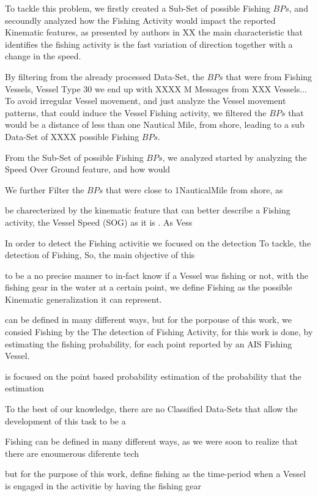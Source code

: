 To tackle this problem, we firstly created a Sub-Set of possible Fishing $BPs$, and secoundly analyzed how the Fishing Activity would impact the reported Kinematic features, as presented by authors in XX the main characteristic that identifies the fishing activity is the fast variation of direction together with a change in the speed.

By filtering from the already processed Data-Set, the $BPs$ that were from Fishing Vessels, Vessel Type 30 we end up with XXXX M Messages from XXX Vessels... To avoid irregular Vessel movement,  and just analyze the Vessel movement patterns, that could induce the Vessel Fishing activity, we filtered the $BPs$ that would be a distance of less than one Nautical Mile, from shore, leading to a sub Data-Set of XXXX possible Fishing $BPs$.

From the Sub-Set of possible Fishing $BPs$, we analyzed started by analyzing the Speed Over Ground feature, and how would  



\iffalse
We further Filter the $BPs$ that were close to 1NauticalMile from shore, as 

be charecterized by the kinematic feature that can better describe a Fishing activity, the Vessel Speed (SOG) as it is . As Vess

In order to detect the Fishing activitie we focused on the detection 
To tackle, the detection of Fishing, So, the main objective of this  

to be a no precise manner to in-fact know if a Vessel was fishing or not, with the fishing gear in the water at a certain point, we define Fishing as the possible Kinematic generalization it can represent.

can be defined in many different ways, but for the porpouse of this work, we consied Fishing by the 
The detection of Fishing Activity, for this work is done, by estimating the fishing probability, for each point reported by an AIS Fishing Vessel. 

is focused on the point based probability estimation of the probability that the estimation 

To the best of our knowledge, there are no Classified Data-Sets that allow the development of this task to be a 

Fishing can be defined in many different ways, as we were soon to realize that there are enoumerous diferente tech

but for the purpose of this work, define fishing as the time-period when a Vessel is engaged in the activitie by having the fishing gear 

